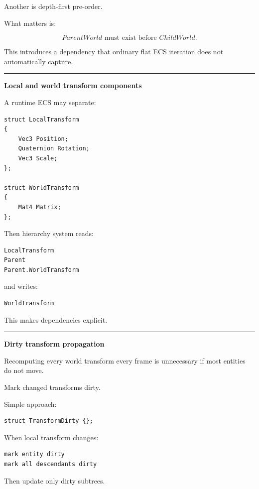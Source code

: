 Another is depth-first pre-order.

What matters is:

\[
\boxed{
ParentWorld
\text{ must exist before }
ChildWorld.
}
\]

This introduces a dependency that ordinary flat ECS iteration does not automatically capture.

\begin{center}\rule{0.5\linewidth}{0.5pt}\end{center}

\textbf{Local and world transform components}

A runtime ECS may separate:

\begin{verbatim}
struct LocalTransform
{
    Vec3 Position;
    Quaternion Rotation;
    Vec3 Scale;
};

struct WorldTransform
{
    Mat4 Matrix;
};
\end{verbatim}

Then hierarchy system reads:

\begin{verbatim}
LocalTransform
Parent
Parent.WorldTransform
\end{verbatim}

and writes:

\begin{verbatim}
WorldTransform
\end{verbatim}

This makes dependencies explicit.

\begin{center}\rule{0.5\linewidth}{0.5pt}\end{center}

\textbf{Dirty transform propagation}

Recomputing every world transform every frame is unnecessary if most entities do not move.

Mark changed transforms dirty.

Simple approach:

\begin{verbatim}
struct TransformDirty {};
\end{verbatim}

When local transform changes:

\begin{verbatim}
mark entity dirty
mark all descendants dirty
\end{verbatim}

Then update only dirty subtrees.

